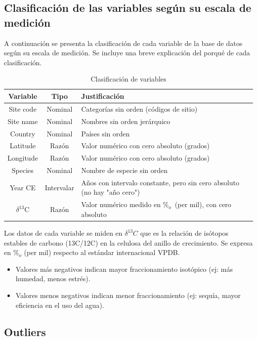 \documentclass[a4paper,11pt]{article}
\begin{document}
\newpage

\subsection*{Clasificación de las variables según su escala de medición}

A continuación se presenta la clasificación de cada variable de la base de datos
según su escala de medición. Se incluye una breve explicación del porqué de cada
clasificación.

\begin{table}[ht]
    \centering
    \caption{Clasificación de variables}
    \label{tab:clasificacion_variables}
    \begin{tabular}{|c|c|l|}
        \hline
        \textbf{Variable} & \textbf{Tipo} & \textbf{Justificación} \\
        \hline
        Site code & Nominal & Categorías sin orden (códigos de sitio) \\
        Site name & Nominal & Nombres sin orden jerárquico \\
        Country & Nominal & Países sin orden \\
        Latitude & Razón & Valor numérico con cero absoluto (grados) \\
        Longitude & Razón & Valor numérico con cero absoluto (grados) \\
        Species & Nominal & Nombre de especie sin orden \\
        Year CE & Intervalar & Años con intervalo constante, pero sin cero
        absoluto (no hay "año cero") \\
        $\delta^{13}$C & Razón & Valor numérico medido en $\%_o$\
        (per mil), con cero absoluto\\
        \hline
    \end{tabular}
\end{table}

Los datos de cada variable se miden en $\delta^{13}C$ que es la relación de isótopos estables de carbono (13C/12C) en la celulosa del anillo de crecimiento. Se expresa en $\%_o$ (per mil) respecto al estándar internacional VPDB.
\begin{itemize}
	\item Valores más negativos indican mayor fraccionamiento isotópico (ej: más humedad, menos estrés).

	\item Valores menos negativos indican menor fraccionamiento (ej: sequía, mayor eficiencia en el uso del agua).
\end{itemize}


\subsection*{Outliers}
\end{document}
